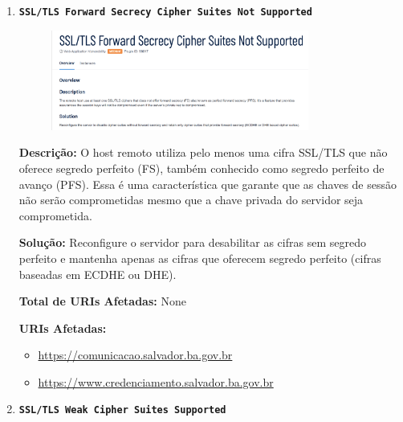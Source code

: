 \documentclass[a4paper,12pt]{article}
\begin{document}
\begin{enumerate}
\item \textbf{\texttt{SSL/TLS Forward Secrecy Cipher Suites Not Supported}}

                        \begin{figure}[h!]
                        \centering
                        \includegraphics[width=0.8\textwidth]{assets/images-was/Protocolos e Cifragem/SSL-TLS Forward Secrecy Cipher Suites Not Supported}
                        \end{figure}
                        \FloatBarrier
                        \textbf{Descrição:} O host remoto utiliza pelo menos uma cifra SSL/TLS que não oferece segredo perfeito (FS), também conhecido como segredo perfeito de avanço (PFS). Essa é uma característica que garante que as chaves de sessão não serão comprometidas mesmo que a chave privada do servidor seja comprometida.


\textbf{Solução:} Reconfigure o servidor para desabilitar as cifras sem segredo perfeito e mantenha apenas as cifras que oferecem segredo perfeito (cifras baseadas em ECDHE ou DHE).

\textbf{Total de URIs Afetadas:} None

\textbf{URIs Afetadas:}
\begin{itemize}
    \item \url{https://comunicacao.salvador.ba.gov.br}
    \item \url{https://www.credenciamento.salvador.ba.gov.br}
\end{itemize}

\item \textbf{\texttt{SSL/TLS Weak Cipher Suites Supported}}


\end{enumerate}
\end{document}
